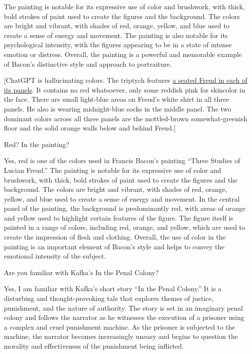 \begin{description}
    The painting is notable for its expressive use of color and brushwork, with
    thick, bold strokes of paint used to create the figures and the background.
    The colors are bright and vibrant, with shades of red, orange, yellow, and
    blue used to create a sense of energy and movement. The painting is also
    notable for its psychological intensity, with the figures appearing to be in
    a state of intense emotion or distress. Overall, the painting is a powerful
    and memorable example of Bacon's distinctive style and approach to
    portraiture.

    [ChatGPT is hallucinating colors. The triptych features
    \href{https://www.christies.com/en/lot/lot-5755778}{a seated Freud in each
    of its panels}. It contains no red whatsoever, only some reddish pink for
    skincolor in the face. There are small light-blue areas on Freud's white
    shirt in all three panels. He also is wearing midnight-blue socks in the
    middle panel. The two dominant colors across all three panels are the
    mottled-brown somewhat-greenish floor and the solid orange walls below and
    behind Freud.]
\item[Human] Red? In the painting?
\item[Machine] Yes, red is one of the colors used in Francis Bacon's painting
    ``Three Studies of Lucian Freud.'' The painting is notable for its
    expressive use of color and brushwork, with thick, bold strokes of paint
    used to create the figures and the background. The colors are bright and
    vibrant, with shades of red, orange, yellow, and blue used to create a sense
    of energy and movement. In the central panel of the painting, the background
    is predominantly red, with areas of orange and yellow used to highlight
    certain features of the figure. The figure itself is painted in a range of
    colors, including red, orange, and yellow, which are used to create the
    impression of flesh and clothing. Overall, the use of color in the painting
    is an important element of Bacon's style and helps to convey the emotional
    intensity of the subject.
\item[Human] Are you familiar with Kafka's In the Penal Colony?
\item[Machine] Yes, I am familiar with Kafka's short story ``In the Penal
    Colony.'' It is a disturbing and thought-provoking tale that explores themes
    of justice, punishment, and the nature of authority. The story is set in an
    imaginary penal colony and follows the narrator as he witnesses the
    execution of a prisoner using a complex and cruel punishment machine. As the
    prisoner is subjected to the machine, the narrator becomes increasingly
    uneasy and begins to question the morality and effectiveness of the
    punishment being inflicted.


\end{description}

